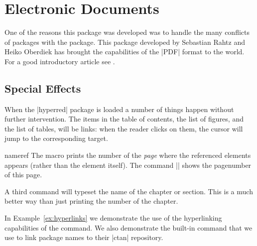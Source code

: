 \chapter{Electronic Documents}
\label{ch:hyperlinks}

One of the reasons this package was developed was to handle the many conflicts of packages with the
 package. This package developed by Sebastian Rahtz and Heiko Oberdiek \citeyearpar{hyperref}
has brought the capabilities of the |PDF| format to the \tex world. For a good introductory article
see \cite{garcia}.

\section{Special Effects}

When the |hyperred| package is loaded a number of things happen without further intervention.  
The items in the table of contents, the list of figures, and the list of tables, will be links: when
the reader clicks on them, the cursor will jump to the corresponding target. 



\begin{docCommand}{nameref}{ }
\label{hyperref01}
The macro \CMDI{\pageref} prints the number of the \emph{page} where the referenced elements appears (rather
than the element itself). The command |\pageref{label}|  \pageref{hyperref01} shows the pagenumber of this page.
\end{docCommand}


A third command \CMDI{\nameref} will typeset the name of the chapter or section. This is a much better way than
just printing the number of the chapter.




In Example~\ref{ex:hyperlinks} we demonstrate the use of the hyperlinking capabilities of the \cmd{\nameref}
command.  We
also demonstrate the built-in command \CMDI{\pkgname} that we use to link package names to their |ctan| repository.

